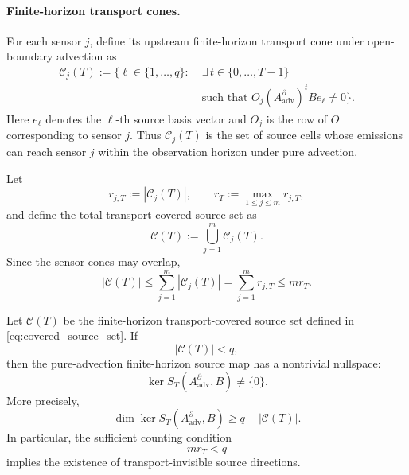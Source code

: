 \paragraph{Finite-horizon transport cones.}
For each sensor \(j\), define its upstream finite-horizon transport cone
under open-boundary advection as
\[
\begin{aligned}
\mathcal C_j(T)
:=
\bigl\{
\ell\in\{1,\ldots,q\}:\;&
\exists\, t\in\{0,\ldots,T-1\}
\\
&\text{such that }
O_j (A_{\mathrm{adv}}^{\partial})^t B e_\ell \neq 0
\bigr\}.
\label{eq:transport_cone_def}
\end{aligned}
\]
Here \(e_\ell\) denotes the \(\ell\)-th source basis vector and \(O_j\)
is the row of \(O\) corresponding to sensor \(j\). Thus
\(\mathcal C_j(T)\) is the set of source cells whose emissions can reach
sensor \(j\) within the observation horizon under pure advection.

Let
\begin{equation}
r_{j,T}:=|\mathcal C_j(T)|,
\qquad
r_T:=\max_{1\le j\le m} r_{j,T},
\end{equation}
and define the total transport-covered source set as
\begin{equation}
\mathcal C(T)
:=
\bigcup_{j=1}^m \mathcal C_j(T).
\label{eq:covered_source_set}
\end{equation}
Since the sensor cones may overlap,
\begin{equation}
|\mathcal C(T)|
\le
\sum_{j=1}^m |\mathcal C_j(T)|
=
\sum_{j=1}^m r_{j,T}
\le
m r_T.
\label{eq:cone_union_bound}
\end{equation}

\begin{lemma}
\label{lem:sparse_transport_noncoverage}
Let \(\mathcal C(T)\) be the finite-horizon transport-covered source set
defined in \eqref{eq:covered_source_set}. If
\begin{equation}
|\mathcal C(T)| < q,
\label{eq:transport_noncoverage_condition}
\end{equation}
then the pure-advection finite-horizon source map has a nontrivial
nullspace:
\begin{equation}
\ker S_T(A_{\mathrm{adv}}^{\partial},B)\neq \{0\}.
\end{equation}
More precisely,
\begin{equation}
\dim \ker S_T(A_{\mathrm{adv}}^{\partial},B)
\ge
q-|\mathcal C(T)|.
\label{eq:nullspace_dimension_bound}
\end{equation}
In particular, the sufficient counting condition
\begin{equation}
m r_T < q
\label{eq:sufficient_sparse_condition}
\end{equation}
implies the existence of transport-invisible source directions.
\end{lemma}

